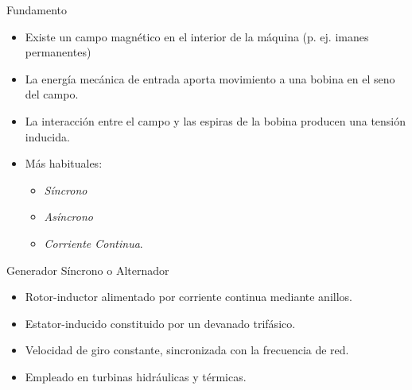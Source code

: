 \documentclass[xcolor={usenames,svgnames,dvipsnames}]{beamer}
\begin{document}
\begin{frame}[label={sec:org4c0d458}]{Fundamento}
\begin{itemize}
\item Existe un \alert{campo magnético en el interior de la máquina} (p. ej. imanes permanentes)
\item La \alert{energía mecánica de entrada} aporta \alert{movimiento a una bobina} en el seno del campo.
\item La \alert{interacción} entre el campo y las espiras de la bobina producen una \alert{tensión inducida}.
\item Más habituales:
\begin{itemize}
\item \emph{Síncrono}
\item \emph{Asíncrono}
\item \emph{Corriente Continua}.
\end{itemize}
\end{itemize}
\end{frame}


\begin{frame}[label={sec:orgb405b27}]{Generador Síncrono o Alternador}
\begin{itemize}
\item \alert{Rotor-inductor} alimentado por \alert{corriente continua} mediante anillos.

\item \alert{Estator-inducido} constituido por un \alert{devanado trifásico}.

\item Velocidad de giro constante, sincronizada con la frecuencia de red.

\item Empleado en turbinas hidráulicas y térmicas.
\end{itemize}
\end{frame}
\end{document}
